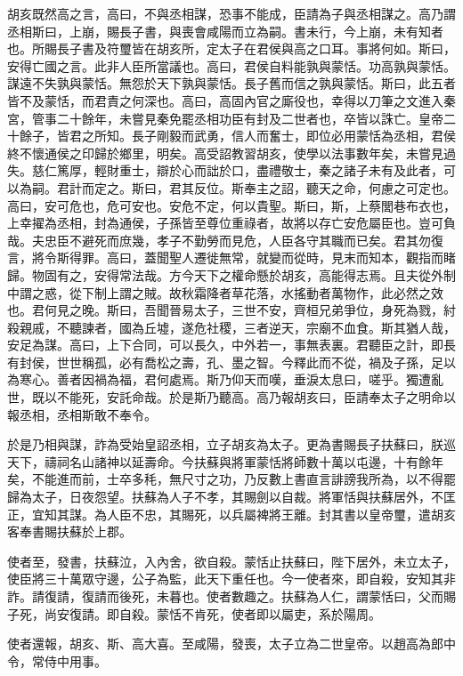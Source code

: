 胡亥既然高之言，高曰，不與丞相謀，恐事不能成，臣請為子與丞相謀之。高乃謂丞相斯曰，上崩，賜長子書，與喪會咸陽而立為嗣。書未行，今上崩，未有知者也。所賜長子書及符璽皆在胡亥所，定太子在君侯與高之口耳。事將何如。斯曰，安得亡國之言。此非人臣所當議也。高曰，君侯自料能孰與蒙恬。功高孰與蒙恬。謀遠不失孰與蒙恬。無怨於天下孰與蒙恬。長子舊而信之孰與蒙恬。斯曰，此五者皆不及蒙恬，而君責之何深也。高曰，高固內官之廝役也，幸得以刀筆之文進入秦宮，管事二十餘年，未嘗見秦免罷丞相功臣有封及二世者也，卒皆以誅亡。皇帝二十餘子，皆君之所知。長子剛毅而武勇，信人而奮士，即位必用蒙恬為丞相，君侯終不懷通侯之印歸於鄉里，明矣。高受詔教習胡亥，使學以法事數年矣，未嘗見過失。慈仁篤厚，輕財重士，辯於心而詘於口，盡禮敬士，秦之諸子未有及此者，可以為嗣。君計而定之。斯曰，君其反位。斯奉主之詔，聽天之命，何慮之可定也。高曰，安可危也，危可安也。安危不定，何以貴聖。斯曰，斯，上蔡閭巷布衣也，上幸擢為丞相，封為通侯，子孫皆至尊位重祿者，故將以存亡安危屬臣也。豈可負哉。夫忠臣不避死而庶幾，孝子不勤勞而見危，人臣各守其職而已矣。君其勿復言，將令斯得罪。高曰，蓋聞聖人遷徙無常，就變而從時，見末而知本，觀指而睹歸。物固有之，安得常法哉。方今天下之權命懸於胡亥，高能得志焉。且夫從外制中謂之惑，從下制上謂之賊。故秋霜降者草花落，水搖動者萬物作，此必然之效也。君何見之晚。斯曰，吾聞晉易太子，三世不安，齊桓兄弟爭位，身死為戮，紂殺親戚，不聽諫者，國為丘墟，遂危社稷，三者逆天，宗廟不血食。斯其猶人哉，安足為謀。高曰，上下合同，可以長久，中外若一，事無表裏。君聽臣之計，即長有封侯，世世稱孤，必有喬松之壽，孔、墨之智。今釋此而不從，禍及子孫，足以為寒心。善者因禍為福，君何處焉。斯乃仰天而嘆，垂淚太息曰，嗟乎。獨遭亂世，既以不能死，安託命哉。於是斯乃聽高。高乃報胡亥曰，臣請奉太子之明命以報丞相，丞相斯敢不奉令。

於是乃相與謀，詐為受始皇詔丞相，立子胡亥為太子。更為書賜長子扶蘇曰，朕巡天下，禱祠名山諸神以延壽命。今扶蘇與將軍蒙恬將師數十萬以屯邊，十有餘年矣，不能進而前，士卒多秏，無尺寸之功，乃反數上書直言誹謗我所為，以不得罷歸為太子，日夜怨望。扶蘇為人子不孝，其賜劍以自裁。將軍恬與扶蘇居外，不匡正，宜知其謀。為人臣不忠，其賜死，以兵屬裨將王離。封其書以皇帝璽，遣胡亥客奉書賜扶蘇於上郡。

使者至，發書，扶蘇泣，入內舍，欲自殺。蒙恬止扶蘇曰，陛下居外，未立太子，使臣將三十萬眾守邊，公子為監，此天下重任也。今一使者來，即自殺，安知其非詐。請復請，復請而後死，未暮也。使者數趣之。扶蘇為人仁，謂蒙恬曰，父而賜子死，尚安復請。即自殺。蒙恬不肯死，使者即以屬吏，系於陽周。

使者還報，胡亥、斯、高大喜。至咸陽，發喪，太子立為二世皇帝。以趙高為郎中令，常侍中用事。

